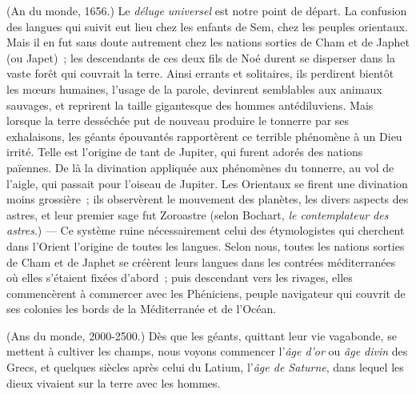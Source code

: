 \documentclass[french,twoside]{book} %
\begin{document}
\par
(An du monde, 1656.) Le {\itshape déluge universel} est notre point de départ. La confusion des langues qui suivit eut lieu chez les enfants de Sem, chez les peuples orientaux. Mais il en fut sans doute autrement chez les nations sorties de Cham et de Japhet (ou Japet) ; les descendants de ces deux fils de Noé durent se disperser dans la vaste forêt qui couvrait la terre. Ainsi errants  et solitaires, ils perdirent bientôt les mœurs humaines, l’usage de la parole, devinrent semblables aux animaux sauvages, et reprirent la taille gigantesque des hommes antédiluviens. Mais lorsque la terre desséchée put de nouveau produire le tonnerre par ses exhalaisons, les géants épouvantés rapportèrent ce terrible phénomène à un Dieu irrité. Telle est l’origine de tant de Jupiter, qui furent adorés des nations païennes. De là la divination appliquée aux phénomènes du tonnerre, au vol de l’aigle, qui passait pour l’oiseau de Jupiter. Les Orientaux se firent une divination moins grossière ; ils observèrent le mouvement des planètes, les divers aspects des astres, et leur premier sage fut Zoroastre (selon Bochart, \emph{{\itshape le contemplateur des astres}}.) — Ce système ruine nécessairement celui des étymologistes qui cherchent dans l’Orient l’origine de toutes les langues. Selon nous, toutes les nations sorties de Cham et de Japhet se créèrent leurs langues dans les contrées méditerranées où elles s’étaient fixées d’abord ; puis descendant vers les rivages, elles commencèrent à commercer avec les Phéniciens, peuple navigateur qui couvrit de ses colonies les bords de la Méditerranée et de l’Océan.\par
(Ans du monde, 2000-2500.) Dès que les géants, quittant leur vie vagabonde, se mettent à cultiver les champs, nous voyons commencer l’{\itshape âge d’or} ou {\itshape âge divin} des Grecs, et quelques siècles après celui du Latium, l’{\itshape âge de Saturne}, dans lequel les dieux vivaient sur la terre avec les hommes.\par
\end{document}
